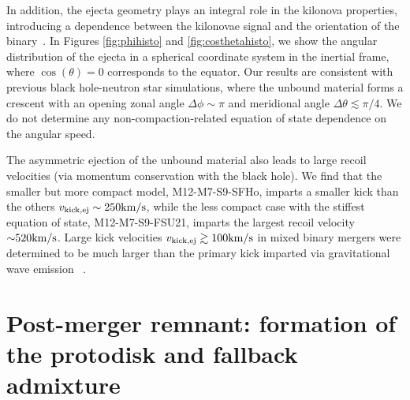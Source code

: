 In addition, the ejecta geometry plays an integral role in the kilonova properties, introducing a dependence between the kilonovae signal and the orientation of the binary~\cite{FoucartDD2:2017}.
In Figures \ref{fig:phihisto} and \ref{fig:costhetahisto}, we show the angular distribution of the ejecta in a spherical coordinate system in the inertial frame, where $\cos(\theta) = 0$ corresponds to the equator.  
Our results are consistent with previous black hole-neutron star simulations, where the unbound material forms a crescent with an opening zonal angle $\Delta \phi \sim \pi$ and meridional angle $\Delta \theta \lesssim \pi/4$.
We do not determine any non-compaction-related equation of state dependence on the angular speed.


The asymmetric ejection of the unbound material also leads to large recoil velocities (via momentum conservation with the black hole).  We find that the smaller but more compact model, M12-M7-S9-SFHo, imparts a smaller kick than the others $v_{\rm kick,ej} \sim 250 {\rm km/s}$, while the less compact case with the stiffest equation of state, M12-M7-S9-FSU21, imparts the largest recoil velocity $\mathord{\sim} 520 {\rm km/s}$.  Large kick velocities $v_{\rm kick,ej} \gtrsim100 {\rm km/s}$ in mixed binary mergers were determined to be much larger than the primary kick imparted via gravitational wave emission ~\cite{Kyutoku:2011vz}. 

\section{Post-merger remnant: formation of the protodisk and fallback admixture}
\label{sec:disk-analysis}

